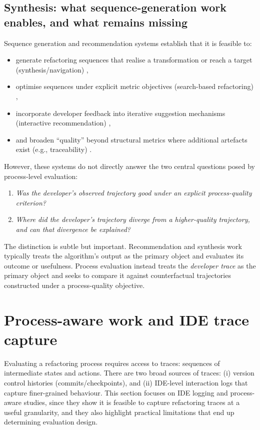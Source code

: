 \subsection{Synthesis: what sequence-generation work enables, and what remains missing}
Sequence generation and recommendation systems establish that it is feasible to:
\begin{itemize}
  \item generate refactoring sequences that realise a transformation or reach a target (synthesis/navigation) \cite{raychev2013resynth,lin2016navigator},
  \item optimise sequences under explicit metric objectives (search-based refactoring) \cite{harman2007pareto,mohan2019manyobjective},
  \item incorporate developer feedback into iterative suggestion mechanisms (interactive recommendation) \cite{alizadeh2020interactive},
  \item and broaden ``quality'' beyond structural metrics where additional artefacts exist (e.g., traceability) \cite{wang2018traceability}.
\end{itemize}
However, these systems do not directly answer the two central questions posed by process-level evaluation:
\begin{enumerate}
  \item \emph{Was the developer's observed trajectory good under an explicit process-quality criterion?}
  \item \emph{Where did the developer's trajectory diverge from a higher-quality trajectory, and can that divergence be explained?}
\end{enumerate}
The distinction is subtle but important. Recommendation and synthesis work typically treats the algorithm's output as the primary object and evaluates its outcome or usefulness. Process evaluation instead treats the \emph{developer trace} as the primary object and seeks to compare it against counterfactual trajectories constructed under a process-quality objective.

\section{Process-aware work and IDE trace capture}
\label{sec:process-aware-logging}

Evaluating a refactoring process requires access to traces: sequences of intermediate states and actions. There are two broad sources of traces: (i) version control histories (commits/checkpoints), and (ii) IDE-level interaction logs that capture finer-grained behaviour. This section focuses on IDE logging and process-aware studies, since they show it is feasible to capture refactoring traces at a useful granularity, and they also highlight practical limitations that end up determining evaluation design.

